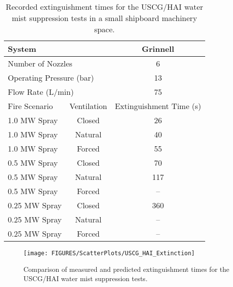 \begin{table}[h!]
\caption[USCG/HAI water mist suppression extinguishment times.]{Recorded extinguishment times for the USCG/HAI water mist suppression tests in a small shipboard machinery space.}
\begin{center}
\begin{tabular}{|l|c|c|}
\hline
\multicolumn{2}{|l|}{System}                        & Grinnell \\ \hline  \hline
\multicolumn{2}{|l|}{Number of Nozzles}             & 6        \\ \hline
\multicolumn{2}{|l|}{Operating Pressure (bar)}      & 13        \\ \hline
\multicolumn{2}{|l|}{Flow Rate (L/min)}             & 75        \\ \hline \hline
Fire Scenario       & Ventilation                   & Extinguishment Time (s) \\ \hline \hline
1.0 MW Spray        & Closed                        & 26        \\ \hline
1.0 MW Spray        & Natural                       & 40        \\ \hline
1.0 MW Spray        & Forced                        & 55        \\ \hline
0.5 MW Spray        & Closed                        & 70        \\ \hline
0.5 MW Spray        & Natural                       & 117       \\ \hline
0.5 MW Spray        & Forced                        & --        \\ \hline
0.25 MW Spray       & Closed                        & 360       \\ \hline
0.25 MW Spray       & Natural                       & --        \\ \hline
0.25 MW Spray       & Forced                        & --        \\ \hline
\end{tabular}
\end{center}
\label{USCG_HAI_Times}
\end{table}

\begin{figure}[h!]
\begin{center}
\texttt{[image: FIGURES/ScatterPlots/USCG\_HAI\_Extinction]}
\caption[Comparison of measured and predicted extinguishment times for the USCG/HAI water mist suppression tests.]{Comparison of measured and predicted extinguishment times for the USCG/HAI water mist suppression tests.}
\end{center}
\label{USCG_Scatter}
\end{figure}




